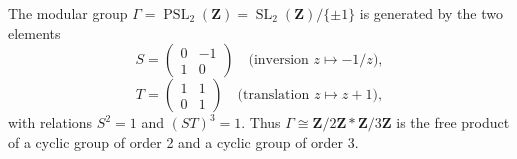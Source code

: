 The modular group $\Gamma = \operatorname{PSL}_2(\mathbf{Z}) = \operatorname{SL}_2(\mathbf{Z})/\{\pm 1\}$ is generated by the two elements
$$
S = \begin{pmatrix} 0 & -1 \\ 1 & 0 \end{pmatrix} \quad \text{(inversion } z \mapsto -1/z\text{)},
$$
$$
T = \begin{pmatrix} 1 & 1 \\ 0 & 1 \end{pmatrix} \quad \text{(translation } z \mapsto z+1\text{)},
$$
with relations $S^2 = 1$ and $(ST)^3 = 1$. Thus $\Gamma \cong \mathbf{Z}/2\mathbf{Z} * \mathbf{Z}/3\mathbf{Z}$ is the free product of a cyclic group of order 2 and a cyclic group of order 3.

